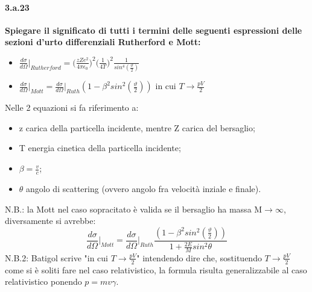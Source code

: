 \documentclass[twoside]{article}
\begin{document}
\paragraph{3.a.23}\textbf{Spiegare il significato di tutti i termini delle seguenti espressioni delle sezioni d’urto differenziali Rutherford e Mott:}
\begin{itemize}
    \item $\frac{d\sigma}{d\Omega}\biggr|_{Rutherford}=\biggl(\frac{zZe^2}{4\pi\epsilon_0}\biggr)^2\biggl(\frac{1}{4T}\biggr)^2\frac{1}{sin^4(\frac{\vartheta}{2})}$\\
    \item $\frac{d\sigma}{d\Omega}\biggr|_{Mott}=\frac{d\sigma}{d\Omega}\biggr|_{Ruth}(1-\beta^2sin^2(\frac{\vartheta}{2}))$  in cui $T\longrightarrow\frac{pV}{2}$
\end{itemize}
Nelle 2 equazioni si fa riferimento a:
\begin{itemize}
    \item z carica della particella incidente, mentre Z carica del bersaglio;
    \item T energia cinetica della particella incidente;
    \item $\beta=\frac{v}{c}$;
    \item $\theta$ angolo di scattering (ovvero angolo fra velocità inziale e finale).
\end{itemize}
N.B.: la Mott nel caso sopracitato è valida se il bersaglio ha massa M$\to\infty$, diversamente si avrebbe:
\begin{equation}
    \frac{d\sigma}{d\Omega}\biggr|_{Mott}=\frac{d\sigma}{d\Omega}\biggr|_{Ruth}\frac{(1-\beta^2sin^2(\frac{\vartheta}{2}))}{1+\frac{2E}{M}sin^2\theta}
\end{equation}
N.B.2: Batigol scrive "in cui $T\longrightarrow\frac{pV}{2}$" intendendo dire che, sostituendo $T\longrightarrow\frac{pV}{2}$ come si è soliti fare nel caso relativistico, la formula risulta generalizzabile al caso relativistico ponendo $p=mv\gamma$.\\
\end{document}
